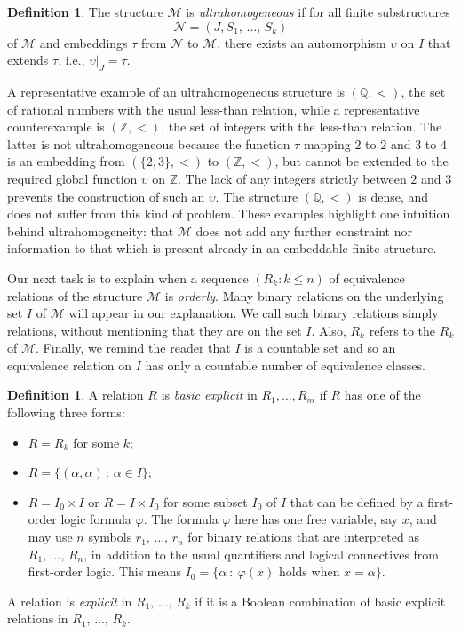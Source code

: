 \documentclass[10pt]{amsart}
\theoremstyle{definition}\newtheorem{defi}[theo]{Definition}\newtheorem{rema}[theo]{Remark}\newtheorem{exam}[theo]{Example}\newtheorem{exem}[theo]{Example}\newtheorem{nota}[theo]{Notation}
\newcommand*\Q{\mathbb{Q}}
\newcommand*\Z{\mathbb{Z}}
\newcommand*\NN{\mathcal{N}}
\newcommand*\MM{\mathcal{M}}
\begin{document}
\begin{defi}\label{def: ultrahomogeneity}
The structure $\MM$ is \emph{ultrahomogeneous} if for all finite substructures
\[
\NN = (J,S_1,\,\ldots,\,S_k)
\]
of $\MM$ and embeddings $\tau$ from $\NN$ to $\MM$, there exists an automorphism $\upsilon$ on $I$ that extends $\tau$, i.e., $\upsilon|_J = \tau$.
\end{defi}

A representative example of an ultrahomogeneous structure is $(\Q,<)$, the set of rational numbers with the usual less-than relation, while a representative counterexample is $(\Z,<)$, the set of integers with the less-than relation. The latter is not ultrahomogeneous because the function $\tau$ mapping $2$ to $2$ and $3$ to $4$ is an embedding from $(\{2,3\},<)$ to $(\Z,<)$, but cannot be extended to the required global function $\upsilon$ on $\Z$. The lack of any integers strictly between $2$ and $3$ prevents the construction of such an $\upsilon$. The structure $(\Q,<)$ is dense, and does not suffer from this kind of problem. These examples highlight one intuition behind ultrahomogeneity: that $\MM$ does not add any further constraint nor information to that which is present already in an embeddable finite structure.

Our next task is to explain when a sequence $(R_k : k \leq n)$ of equivalence relations of the structure $\MM$ is \emph{orderly}. Many binary relations on the underlying set $I$ of $\MM$ will appear in our explanation. We call such binary relations simply relations, without mentioning that they are on the set $I$. Also, $R_k$ refers to the $R_k$ of $\MM$. Finally, we remind the reader that $I$ is a countable set and so an equivalence relation on $I$ has only a countable number of equivalence classes.

\begin{defi}\label{def: explicit}
A relation $R$ is \emph{basic explicit} in $R_1,\ldots,R_m$ if $R$ has one of the following three forms:
\begin{itemize}
\item $R = R_k$ for some $k$;
\item $R = \{(\alpha,\alpha)\,:\,\alpha \in I\}$;
\item $R = I_0 \times I$ or $R = I \times I_0$ for some subset $I_0$ of $I$ that can be defined by a first-order logic formula $\varphi$. The formula $\varphi$ here has one free variable, say $x$, and may use $n$ symbols $r_1,\,\ldots,\,r_n$ for binary relations that are interpreted as $R_1,\,\ldots,\,R_n$, in addition to the usual quantifiers and logical connectives from first-order logic. This means $I_0 = \{ \alpha~:~\varphi(x)$ holds when $x=\alpha\}$.
\end{itemize}
A relation is \emph{explicit} in $R_1,\,\ldots,\,R_k$ if it is a Boolean combination of basic explicit relations in $R_1,\,\ldots,\,R_k$.
\end{defi}
\end{document}
